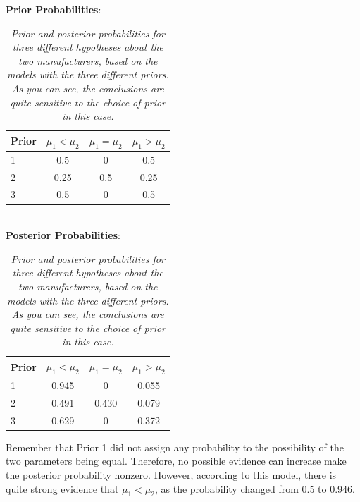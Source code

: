 \begin{table}
\begin{center}
{\bf Prior Probabilities}:\\
\vspace{0.3cm}
\begin{tabular}{|l|c|c|c|}
\hline
Prior	&	$\mu_1 < \mu_2$	& $\mu_1 = \mu_2$	& $\mu_1 > \mu_2$\\
\hline
1 	&	0.5		&	0		&	0.5\\
2 	&	0.25		&	0.5		&	0.25\\
3 	&	0.5		&	0		&	0.5\\
\hline
\end{tabular}\\
\vspace{0.5cm}
{\bf Posterior Probabilities}:\\
\vspace{0.3cm}
\begin{tabular}{|l|c|c|c|}
\hline
Prior	&	$\mu_1 < \mu_2$	& $\mu_1 = \mu_2$	& $\mu_1 > \mu_2$\\
\hline
1 	&	0.945		&	0		&	0.055\\
2 	&	0.491		&	0.430		&	0.079\\
3 	&	0.629		&	0		&	0.372\\
\hline
\end{tabular}
\caption{\it Prior and posterior probabilities for three different hypotheses about
the two manufacturers, based on the models with the three different priors.
As you can see, the conclusions are quite sensitive to the choice of prior in
this case.
\label{tab:ttest_results}}
\end{center}
\end{table}

Remember that Prior 1 did not assign any probability to the possibility of the
two parameters being equal. Therefore, no possible evidence can increase
make the posterior probability nonzero. However, according to this model, there
is quite strong evidence that $\mu_1 < \mu_2$, as the probability changed from
0.5 to 0.946.

